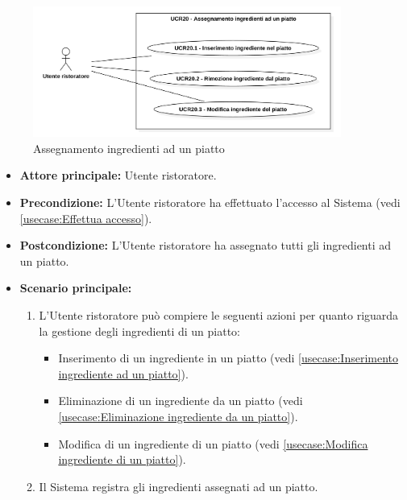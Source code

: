 \newpage
{}
\label{usecase:Assegnamento ingredienti ad un piatto}

\begin{figure}[h]
	\centering
	\includegraphics[width=0.9\textwidth]{./uml/UCR20.png} 
	\caption{Assegnamento ingredienti ad un piatto}
	\label{fig:UCR20}
  \end{figure}

\begin{itemize}
	\item \textbf{Attore principale:} Utente ristoratore.

	\item \textbf{Precondizione:} L'Utente ristoratore ha effettuato l'accesso al Sistema (vedi \autoref{usecase:Effettua accesso}).


	\item \textbf{Postcondizione:}
	      L'Utente ristoratore ha assegnato tutti gli ingredienti ad un piatto.

	\item \textbf{Scenario principale:}
	      \begin{enumerate}
			  \item L'Utente ristoratore può compiere le seguenti azioni per quanto riguarda la gestione degli ingredienti di un piatto:
				  \begin{itemize}
					  \item Inserimento di un ingrediente in un piatto (vedi \autoref{usecase:Inserimento ingrediente ad un piatto}).
					  \item Eliminazione di un ingrediente da un piatto (vedi \autoref{usecase:Eliminazione ingrediente da un piatto}).
					  \item Modifica di un ingrediente di un piatto (vedi \autoref{usecase:Modifica ingrediente di un piatto}).
				  \end{itemize}

		      \item Il Sistema registra gli ingredienti assegnati ad un piatto.
        \end{enumerate}
\end{itemize}

